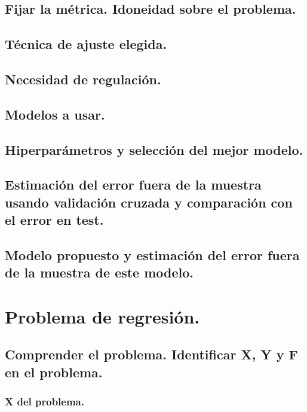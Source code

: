 \documentclass[12pt, spanish]{article}
\begin{document}
\subsection{Fijar la métrica. Idoneidad sobre el problema.}

\subsection{Técnica de ajuste elegida.}

\subsection{Necesidad de regulación.}

\subsection{Modelos a usar.}

\subsection{Hiperparámetros y selección del mejor modelo.}

\subsection{Estimación del error fuera de la muestra usando validación cruzada y comparación con el error en test.}

\subsection{Modelo propuesto y estimación del error fuera de la muestra de este modelo.}




\newpage

\section{Problema de regresión.}

\subsection{Comprender el problema. Identificar X, Y y F en el problema.}


\subsubsection{X del problema.}
\end{document}
